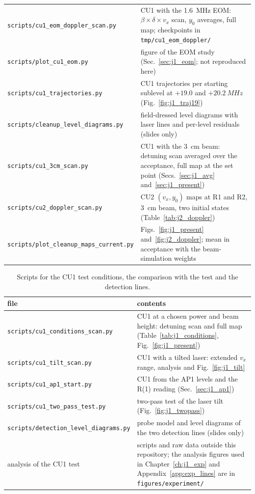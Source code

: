 \documentclass[11pt,a4paper,oneside]{report}
\newcommand{\code}[1]{\texttt{#1}}
\begin{document}
\begin{table}[htbp]
\begin{tabularx}{\textwidth}{lL}
    \code{scripts/cu1\_eom\_doppler\_scan.py} & CU1 with the \SI{1.6}{MHz} EOM: $\beta\times\delta\times v_x$
      scan, $y_0$ averages, full map; checkpoints in \code{tmp/cu1\_eom\_doppler/} \\
    \code{scripts/plot\_cu1\_eom.py} & figure of the EOM study (Sec.~\ref{sec:j1_eom}; not reproduced here) \\
    \code{scripts/cu1\_trajectories.py} & CU1 trajectories per starting sublevel at $+19.0$ and
      $+\SI{20.2}{MHz}$ (Fig.~\ref{fig:j1_traj19}) \\
    \code{scripts/cleanup\_level\_diagrams.py} & field-dressed level diagrams with laser lines and
      per-level residuals (slides only) \\
    \code{scripts/cu1\_3cm\_scan.py} & CU1 with the \SI{3}{cm} beam: detuning scan averaged over the
      acceptance, full map at the set point (Secs.~\ref{sec:j1_avg} and~\ref{sec:j1_present}) \\
    \code{scripts/cu2\_doppler\_scan.py} & CU2 $(v_x,y_0)$ maps at R1 and R2, \SI{3}{cm} beam,
      two initial states (Table~\ref{tab:j2_doppler}) \\
    \code{scripts/plot\_cleanup\_maps\_current.py} & Figs.~\ref{fig:j1_present} and~\ref{fig:j2_doppler};
      mean in acceptance with the beam-simulation weights \\
    \bottomrule
  \end{tabularx}
\end{table}

\begin{table}[htbp]
  \centering
  \caption[Scripts for the CU1 test conditions]{Scripts for the CU1 test conditions, the comparison with the test and the detection lines.}
  \label{tab:code_test}
  \small
  \begin{tabularx}{\textwidth}{lL}
    \toprule
    file & contents \\
    \midrule
    \code{scripts/cu1\_conditions\_scan.py} & CU1 at a chosen power and beam height: detuning scan and full
      map (Table~\ref{tab:j1_conditions}, Fig.~\ref{fig:j1_present}) \\
    \code{scripts/cu1\_tilt\_scan.py} & CU1 with a tilted laser: extended $v_x$ range, analysis and
      Fig.~\ref{fig:j1_tilt} \\
    \code{scripts/cu1\_ap1\_start.py} & CU1 from the AP1 levels and the R(1) reading
      (Sec.~\ref{sec:j1_ap1}) \\
    \code{scripts/cu1\_two\_pass\_test.py} & two-pass test of the laser tilt (Fig.~\ref{fig:j1_twopass}) \\
    \code{scripts/detection\_level\_diagrams.py} & probe model and level diagrams of the two detection
      lines (slides only) \\
    analysis of the CU1 test & scripts and raw data outside this repository; the analysis figures used
      in Chapter~\ref{ch:j1_exp} and Appendix~\ref{app:exp_lines} are in \code{figures/experiment/} \\
    \bottomrule
  \end{tabularx}
\end{table}
\end{document}
